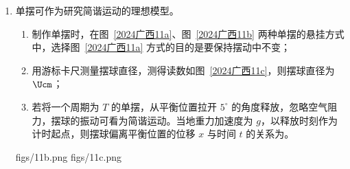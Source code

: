 \documentclass[\gkver]{gaokaozhenti}
\begin{document}
\begin{enumerate}
{B．锤子撞击木栓后木栓获得的动能为

$E_{k} = \frac{1}{2}mv^{2} = \frac{I^{2}}{2m}$

木栓进入过程根据动能定理有

$(mg - \overline{f})\Delta x = 0 - E_{k}$

解得平均阻力为 $f = \frac{I^{2}}{2m\Delta x} + mg$

故 B 正确；

C．木栓进入过程损失的动能与重力势能，一部分转化为系统内能，另一部分转化为木栓的弹性势能，

$\frac{I^{2}}{2m} + mg\Delta x > Q = E_{\text{损}}$

故 C 错误；

D．对木栓的一个侧面受力分析如图。


由于方孔侧壁弹力成线性变化，则有

$\frac{1}{2}(f\sin\theta + F_{N}\cos\theta) = \frac{1}{4}\overline{f}$

且根据 B 选项求得平均阻力 $f = \frac{I^{2}}{2m\Delta x} + mg$

又因为 $f = \mu F_{N}$

联立可得 $f = \frac{\mu(I^{2} + 2m^{2}g\Delta x)}{4m\Delta x(\cos\theta + \mu\sin\theta)}$

故 D 正确。

故选 BD。
}

\item
单摆可作为研究简谐运动的理想模型。
\begin{enumerate}
	\item
	制作单摆时，在图~\ref{2024广西11a}、图~\ref{2024广西11b} 两种单摆的悬挂方式中，选择图~\ref{2024广西11a} 方式的目的是要保持摆动中不变；
	\item
	用游标卡尺测量摆球直径，测得读数如图~\ref{2024广西11c}，则摆球直径为$\Ucm$；
	\item
	若将一个周期为 $T$ 的单摆，从平衡位置拉开 $5^{\circ}$ 的角度释放，忽略空气阻力，摆球的振动可看为简谐运动。当地重力加速度为 $g$，以释放时刻作为计时起点，则摆球偏离平衡位置的位移 $x$ 与时间 $t$ 的关系为。
\end{enumerate}
{figs/11b.png}
{figs/11c.png}


\end{enumerate}
\end{document}

